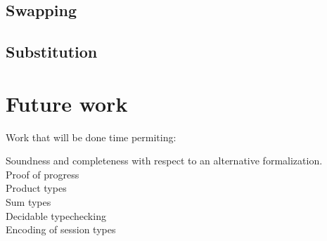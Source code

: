 \documentclass[a4paper,UKenglish,cleveref, autoref, thm-restate,authorcolumns]{lipics-v2019}
\begin{document}
\subsection{Swapping}

\subsection{Substitution}

\section{Future work}

Work that will be done time permiting:

\begin{description}

\item [Soundness and completeness with respect to an alternative formalization.]

\item [Proof of progress]

\item [Product types]

\item [Sum types]

\item [Decidable typechecking]

\item [Encoding of session types]

\end{description}



\end{document}

